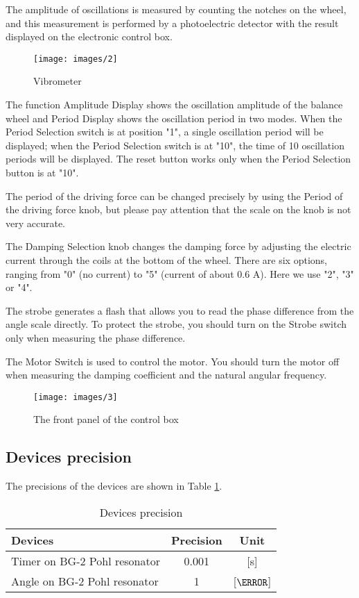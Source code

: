     The amplitude of oscillations is measured by counting the notches on the wheel, and this measurement is performed by a photoelectric detector with the result displayed on the electronic control box.

    \begin{figure}[H]
    \centering
        \texttt{[image: images/2]}
        \caption{Vibrometer}\label{vib}
    \end{figure}

    The function Amplitude Display shows the oscillation amplitude of the balance wheel and Period Display shows the oscillation period in two modes. When the Period Selection switch is at position "1", a single oscillation period will be displayed; when the Period Selection switch is at "10", the time of 10 oscillation periods will be displayed. The reset button works only when the Period Selection button is at "10". 
    
    The period of the driving force can be changed precisely by using the Period of the driving force knob, but please pay attention that the scale on the knob is not very accurate.

    The Damping Selection knob changes the damping force by adjusting the electric current through the coils at the bottom of the wheel. There are six options, ranging from "0" (no current) to "5" (current of about 0.6 A). Here we use "2", "3" or "4".

    The strobe generates a flash that allows you to read the phase difference from the angle scale directly. To protect the strobe, you should turn on the Strobe switch only when measuring the phase difference.

    The Motor Switch is used to control the motor. You should turn the motor off when measuring the damping coefficient and the natural angular frequency.

    \begin{figure}[H]
    \centering
        \texttt{[image: images/3]}
        \caption{The front panel of the control box}\label{panel}
    \end{figure}

\subsection{Devices precision}
    The precisions of the devices are shown in Table \ref{precision}.
    \begin{table}[H]
        \centering
        \begin{tabular}{|l|c|c|}
            \hline
            Devices & Precision & Unit\\ \hline
            Timer on BG-2 Pohl resonator & 0.001 & [s]\\ \hline
            Angle on BG-2 Pohl resonator & 1 & [$\degree$]\\ \hline
        \end{tabular}
        \caption{Devices precision}\label{precision}
    \end{table}